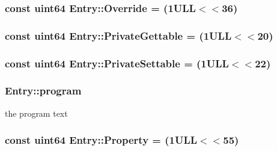 \subsubsection[{Override}]{\setlength{\rightskip}{0pt plus 5cm}const {\bf uint64} Entry\+::\+Override = (1\+U\+L\+L$<$$<$36)\hspace{0.3cm}{\ttfamily [static]}}\label{class_entry_a83dbbe54e04a253b8e9bdbebacf02ab5}
\hypertarget{class_entry_a1ec4277e937f267164c4e89a3eabd59c}{}
\subsubsection[{Private\+Gettable}]{\setlength{\rightskip}{0pt plus 5cm}const {\bf uint64} Entry\+::\+Private\+Gettable = (1\+U\+L\+L$<$$<$20)\hspace{0.3cm}{\ttfamily [static]}}\label{class_entry_a1ec4277e937f267164c4e89a3eabd59c}
\hypertarget{class_entry_a9943c00555ee1577cbdbde3cf575dd3b}{}
\subsubsection[{Private\+Settable}]{\setlength{\rightskip}{0pt plus 5cm}const {\bf uint64} Entry\+::\+Private\+Settable = (1\+U\+L\+L$<$$<$22)\hspace{0.3cm}{\ttfamily [static]}}\label{class_entry_a9943c00555ee1577cbdbde3cf575dd3b}
\hypertarget{class_entry_a8aa37e42f17105b914db76b0c05d0a1f}{}
\subsubsection[{program}]{ Entry\+::program}\label{class_entry_a8aa37e42f17105b914db76b0c05d0a1f}


the program text 

\hypertarget{class_entry_a3f6eae37a5b311029176970ab0fdac14}{}
\subsubsection[{Property}]{\setlength{\rightskip}{0pt plus 5cm}const {\bf uint64} Entry\+::\+Property = (1\+U\+L\+L$<$$<$55)\hspace{0.3cm}{\ttfamily [static]}}\label{class_entry_a3f6eae37a5b311029176970ab0fdac14}
\hypertarget{class_entry_aa923493681980b707bfce77996f21268}{}
